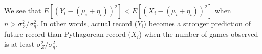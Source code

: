 \documentclass{article}
\begin{document}
      We see that $E[(Y_i - (\mu_i + \eta_i))^2] < E[(X_i - (\mu_i + \eta_i))^2]$ when $n > \sigma^2_Z / \sigma^2_\eta$. In other words, actual record ($Y_i$) becomes a stronger prediction of future record than Pythagorean record ($X_i$) when the number of games observed is at least $\sigma^2_Z / \sigma^2_\eta$.
\end{document}
